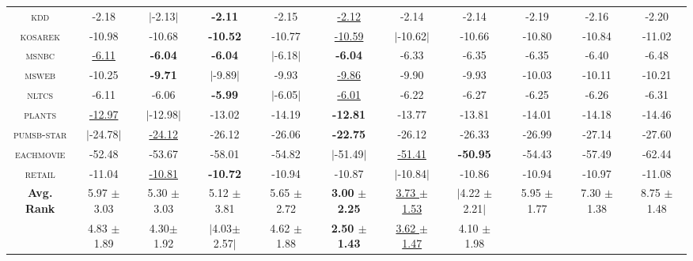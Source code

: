 \begin{sidewaystable}
{\begin{tabular}{c|ccccc|ccccc}
    \textsc{kdd       } & -2.18 & $|$-2.13$|$ & \textbf{-2.11} & -2.15 & \underline{-2.12} & -2.14 & -2.14 & -2.19 & -2.16 & -2.20\\
    \textsc{kosarek   } & -10.98 & -10.68 & \textbf{-10.52} & -10.77 & \underline{-10.59} & $|$-10.62$|$ & -10.66 & -10.80 & -10.84 & -11.02\\
    \textsc{msnbc     } & \underline{-6.11} & \textbf{-6.04} & \textbf{-6.04} & $|$-6.18$|$ & \textbf{-6.04} & -6.33 & -6.35 & -6.35 & -6.40 & -6.48\\
    \textsc{msweb     } & -10.25 & \textbf{-9.71} & $|$-9.89$|$ & -9.93 & \underline{-9.86} & -9.90 & -9.93 & -10.03 & -10.11 & -10.21\\
    \textsc{nltcs     } & -6.11 & -6.06 & \textbf{-5.99} & $|$-6.05$|$ & \underline{-6.01} & -6.22 & -6.27 & -6.25 & -6.26 & -6.31\\
    \textsc{plants    } & \underline{-12.97} & $|$-12.98$|$ & -13.02 & -14.19 & \textbf{-12.81} & -13.77 & -13.81 & -14.01 & -14.18 & -14.46\\
    \textsc{pumsb-star} & $|$-24.78$|$ & \underline{-24.12} & -26.12 & -26.06 & \textbf{-22.75} & -26.12 & -26.33 & -26.99 & -27.14 & -27.60\\
    \textsc{eachmovie } & -52.48 & -53.67 & -58.01 & -54.82 & $|$-51.49$|$ & \underline{-51.41} & \textbf{-50.95} & -54.43 & -57.49 & -62.44\\
    \textsc{retail    } & -11.04 & \underline{-10.81} & \textbf{-10.72} & -10.94 & -10.87 & $|$-10.84$|$ & -10.86 & -10.94 & -10.97 & -11.08\\
    \hline
    \multirow{2}{*}[-0.15em]{\textbf{Avg. Rank}} & 5.97 $\pm$ 3.03 & 5.30 $\pm$ 3.03 & 5.12 $\pm$ 3.81 & 5.65 $\pm$ 2.72 & \textbf{3.00} $\pm$ \textbf{2.25} & \underline{3.73 $\pm$ 1.53} & $|$4.22 $\pm$ 2.21$|$ & 5.95 $\pm$ 1.77 & 7.30 $\pm$ 1.38 & 8.75 $\pm$ 1.48 \\
                                                 & 4.83 $\pm$ 1.89 & 4.30$ \pm$ 1.92 & $|$4.03$ \pm$ 2.57$|$ & 4.62 $\pm$ 1.88 & \textbf{2.50 $\pm$ 1.43} & \underline{3.62 $\pm$ 1.47} & 4.10 $\pm$ 1.98 \\
    \hline
  \end{tabular}
  }

\end{sidewaystable}
